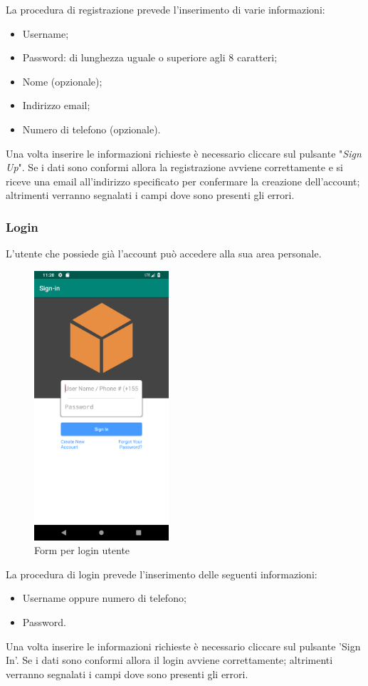 La procedura di registrazione prevede l'inserimento di varie informazioni:
\begin{itemize}
	\item Username;
	\item Password: di lunghezza uguale o superiore agli 8 caratteri;
	\item Nome (opzionale);
	\item Indirizzo email;
	\item Numero di telefono (opzionale).
\end{itemize}
Una volta inserire le informazioni richieste è necessario cliccare sul pulsante "\textit{Sign Up}". Se i dati sono conformi allora la registrazione avviene correttamente e si riceve una email all'indirizzo specificato per confermare la creazione dell'account; altrimenti verranno segnalati i campi dove sono presenti gli errori.
\subsubsection{Login}
\label{sec:funzionalita_applicazione_login}
L'utente che possiede già l'account può accedere alla sua area personale. 
\begin{figure}[H]
	\centering
	\includegraphics[width=5cm]{../includes/pics/app_login_form.png}
	\caption{\label{fig:app_login_form}Form per login utente}
\end{figure}
La procedura di login prevede l'inserimento delle seguenti informazioni:
\begin{itemize}
	\item Username oppure numero di telefono;
	\item Password.
\end{itemize}
Una volta inserire le informazioni richieste è necessario cliccare sul pulsante 'Sign In'. Se i dati sono conformi allora il login avviene correttamente; altrimenti verranno segnalati i campi dove sono presenti gli errori. 

